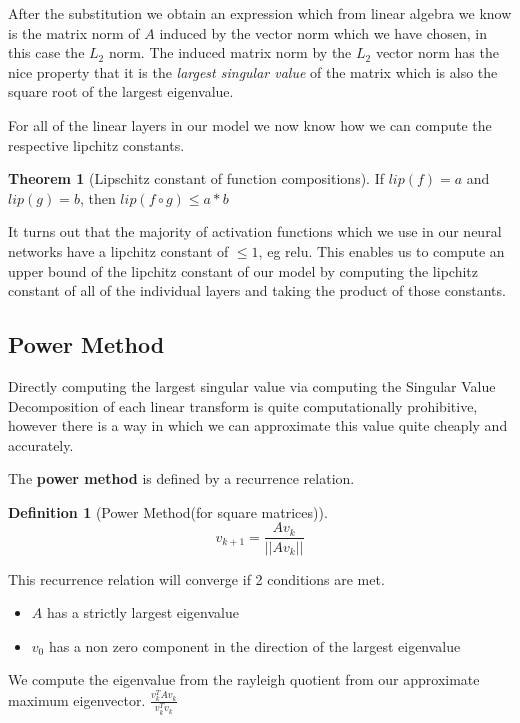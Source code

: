 \documentclass[12pt, a4paper]{report}
\theoremstyle{definition}
\newtheorem{theorem}{Theorem}[section]
\theoremstyle{definition}
\newtheorem{definition}{Definition}[section]
\theoremstyle{definition}
\begin{document}
After the substitution we obtain an expression which from linear algebra we know is the matrix norm of $A$ induced by the vector norm which we have chosen, in this case the $L_2$ norm. The induced matrix norm by the $L_2$ vector norm has the nice property that it is the \textit{largest singular value} of the matrix which is also the square root of the largest eigenvalue.

For all of the linear layers in our model we now know how we can compute the respective lipchitz constants.

\begin{theorem}[Lipschitz constant of function compositions]
    If $lip(f) = a$ and $lip(g) = b$, then $lip(f \circ g) \leq a * b$
\end{theorem}

It turns out that the majority of activation functions which we use in our neural networks have a lipchitz constant of $\leq 1$, eg relu. This enables us to compute an upper bound of the lipchitz constant of our model by computing the lipchitz constant of all of the individual layers and taking the product of those constants.



\subsection{Power Method}

Directly computing the largest singular value via computing the Singular Value Decomposition of each linear transform is quite computationally prohibitive, however there is a way in which we can approximate this value quite cheaply and accurately.

The \textbf{power method} is defined by a recurrence relation.

\begin{definition}[Power Method(for square matrices)]
    $$v_{k+1} = \frac{Av_k}{||Av_k||} $$
\end{definition}

This recurrence relation will converge if 2 conditions are met.

\begin{itemize}
    \item $A$ has a strictly largest eigenvalue
    \item $v_0$ has a non zero component in the direction of the largest eigenvalue
\end{itemize}

We compute the eigenvalue from the rayleigh quotient from our approximate maximum eigenvector. $\frac{v_k^T A v_k}{v_k ^ T v_k}$
\end{document}
